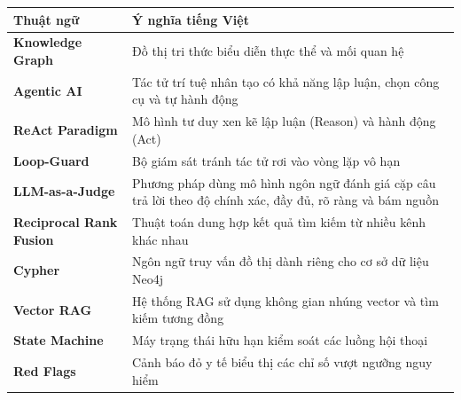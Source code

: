 \documentclass[../main.tex]{subfiles}
\begin{document}
\begin{longtable}{l p{14cm}}
	\hline
   \textbf{Thuật ngữ}  & \textbf{Ý nghĩa tiếng Việt} \\ \hline 
	\textbf{Knowledge Graph} & Đồ thị tri thức biểu diễn thực thể và mối quan hệ \\
	\textbf{Agentic AI} & Tác tử trí tuệ nhân tạo có khả năng lập luận, chọn công cụ và tự hành động \\
	\textbf{ReAct Paradigm} & Mô hình tư duy xen kẽ lập luận (Reason) và hành động (Act) \\
	\textbf{Loop-Guard} & Bộ giám sát tránh tác tử rơi vào vòng lặp vô hạn \\
\textbf{LLM-as-a-Judge} & Phương pháp dùng mô hình ngôn ngữ đánh giá cặp câu trả lời theo độ chính xác, đầy đủ, rõ ràng và bám nguồn \\
	\textbf{Reciprocal Rank Fusion} & Thuật toán dung hợp kết quả tìm kiếm từ nhiều kênh khác nhau \\
	\textbf{Cypher} & Ngôn ngữ truy vấn đồ thị dành riêng cho cơ sở dữ liệu Neo4j \\
	\textbf{Vector RAG} & Hệ thống RAG sử dụng không gian nhúng vector và tìm kiếm tương đồng \\
	\textbf{State Machine} & Máy trạng thái hữu hạn kiểm soát các luồng hội thoại \\
	\textbf{Red Flags} & Cảnh báo đỏ y tế biểu thị các chỉ số vượt ngưỡng nguy hiểm \\

    \hline
\end{longtable}
\end{document}
